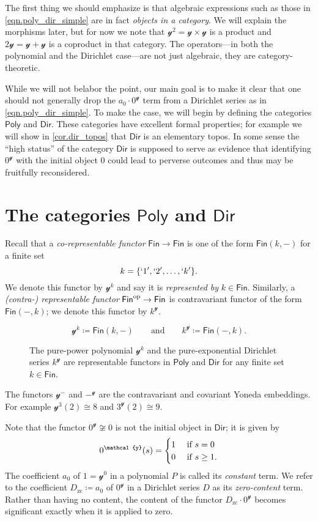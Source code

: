 \documentclass[11pt, article, one side]{memoir}
\theoremstyle{theorem}
\theoremstyle{definition}
\theoremstyle{remark}
\newcommand{\Cat}[1]{\mathsf{#1}}%
\newcommand{\op}{^\tn{op}}
\newcommand{\tn}[1]{\textnormal{#1}}
\newcommand{\finset}{\Cat{Fin}}
\newcommand{\zero}[1]{#1_\text{zc}}
\newcommand{\yon}{\mathcal{y}}
\newcommand{\poly}{\Cat{Poly}}
\newcommand{\dir}{\Cat{Dir}}
\newcommand{\mdot}{{\cdot}}
\newcommand{\qqand}{\qquad\text{and}\qquad}
\begin{document}
The first thing we should emphasize is that algebraic expressions such as those in \cref{eqn.poly_dir_simple} are in fact \emph{objects in a category}. We will explain the morphisms later, but for now we note that $\yon^2=\yon\times\yon$ is a product and $2\yon=\yon+\yon$ is a coproduct in that category. The operators---in both the polynomial and the Dirichlet case---are not just algebraic, they are category-theoretic.

While we will not belabor the point, our main goal is to make it clear that one should not generally drop the $a_0\cdot0^\yon$ term from a Dirichlet series as in \cref{eqn.poly_dir_simple}. To make the case, we will begin by defining the categories $\poly$ and $\dir$. These categories have excellent formal properties; for example we will show in \cref{cor.dir_topos} that $\dir$ is an elementary topos. In some sense the ``high status'' of the category $\dir$ is supposed to serve as evidence that identifying $0^\yon$ with the initial object $0$ could lead to perverse outcomes and thus may be fruitfully reconsidered.

\chapter{The categories $\poly$ and $\dir$}
Recall that a \emph{co-representable functor} $\finset\to\finset$ is one of the form $\finset(k, -)$ for a finite set
\[k=\{`1', `2',\ldots,`k'\}.\]
We denote this functor by $\yon^k$ and say it is \emph{represented by} $k\in\finset$. Similarly, a \emph{(contra-) representable functor} $\finset\op\to\finset$ is contravariant functor of the form $\finset(-,k)$; we denote this functor by $k^\yon$.
\begin{figure}
\[
  \yon^k \coloneqq \finset(k,-)
  \qqand
  k^\yon\coloneqq\finset(-,k).
\]
  \caption{The pure-power polynomial $\yon^k$ and the pure-exponential Dirichlet series $k^\yon$ are representable functors in $\poly$ and $\dir$ for any finite set $k\in\finset$.}
\end{figure}
The functors $\yon^-$ and $-^\yon$ are the contravariant and covariant Yoneda embeddings. For example $\yon^3(2)\cong8$ and $3^\yon(2)\cong9$.

Note that the functor $0^\yon\not\cong 0$ is not the initial object in $\dir$; it is given by
\[
0^\yon(s)=
\begin{cases}
1&\tn{ if } s=0\\
0&\tn{ if } s\geq1.
\end{cases}
\]
The coefficient $a_0$ of $1=\yon^0$ in a polynomial $P$ is called its \emph{constant} term. We refer to the coefficient $\zero{D}\coloneqq a_0$ of $0^\yon$ in a Dirichlet series $D$ as its \emph{zero-content} term. Rather than having no content, the content of the functor $\zero{D}\mdot0^\yon$ becomes significant exactly when it is applied to zero.
\end{document}
